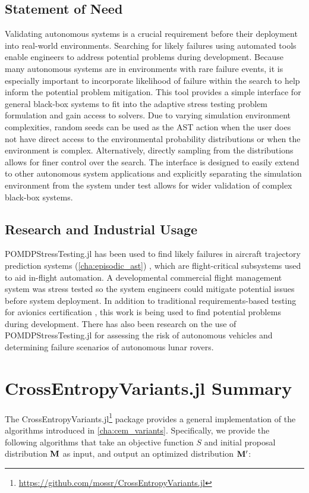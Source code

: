 \subsection{Statement of Need}
Validating autonomous systems is a crucial requirement before their deployment into real-world environments.
Searching for likely failures using automated tools enable engineers to address potential problems during development.
Because many autonomous systems are in environments with rare failure events, it is especially important to incorporate likelihood of failure within the search to help inform the potential problem mitigation.
This tool provides a simple interface for general black-box systems to fit into the adaptive stress testing problem formulation and gain access to solvers.
Due to varying simulation environment complexities, random seeds can be used as the AST action when the user does not have direct access to the environmental probability distributions or when the environment is complex.
Alternatively, directly sampling from the distributions allows for finer control over the search.
The interface is designed to easily extend to other autonomous system applications and explicitly separating the simulation environment from the system under test allows for wider validation of complex black-box systems.



\subsection{Research and Industrial Usage}
POMDPStressTesting.jl has been used to find likely failures in aircraft trajectory prediction systems (\cref{cha:episodic_ast}) \cite{moss2020adaptive}, which are flight-critical subsystems used to aid in-flight automation.
A developmental commercial flight management system was stress tested so the system engineers could mitigate potential issues before system deployment.
In addition to traditional requirements-based testing for avionics certification \cite{do178c}, this work is being used to find potential problems during development.
There has also been research on the use of POMDPStressTesting.jl for assessing the risk of autonomous vehicles and determining failure scenarios of autonomous lunar rovers.



\section{CrossEntropyVariants.jl Summary}
The CrossEntropyVariants.jl\footnote{\url{https://github.com/mossr/CrossEntropyVariants.jl}} package provides a general implementation of the algorithms introduced in \cref{cha:cem_variants}.
Specifically, we provide the following algorithms that take an objective function $S$ and initial proposal distribution $\mathbf{M}$ as input, and output an optimized distribution $\mathbf{M}'$:

